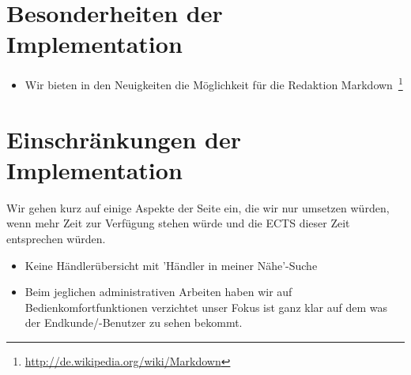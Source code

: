 \documentclass[12pt,a4paper,oneside,ngerman]{article}
\begin{document}
\section{Besonderheiten der Implementation}

\begin{itemize}
	\item Wir bieten in den Neuigkeiten die Möglichkeit für die Redaktion Markdown~\footnote{\url{http://de.wikipedia.org/wiki/Markdown}} 
\end{itemize}

\section{Einschränkungen der Implementation}

Wir gehen kurz auf einige Aspekte der Seite ein, die wir nur umsetzen würden, wenn mehr Zeit zur Verfügung stehen würde und die ECTS dieser Zeit entsprechen würden.

\begin{itemize}
\item Keine Händlerübersicht mit 'Händler in meiner Nähe'-Suche
\item Beim jeglichen administrativen Arbeiten haben wir auf Bedienkomfortfunktionen verzichtet unser Fokus ist ganz klar auf dem was der Endkunde/-Benutzer zu sehen bekommt.
\end{itemize}
\end{document}
